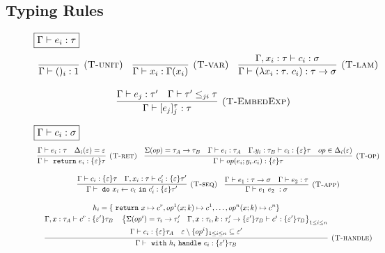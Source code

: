 \subsection{Typing Rules}

\begin{figure}[t]
\footnotesize{
\noindent$\fbox{$\Gamma \vdash e_i : \tau$}$
\[
\begin{array}{c}

\infer[\textsc{(T-unit)}]
  {\Gamma \vdash ()_i : 1}
  {} \quad 

\infer[\textsc{(T-var)}]
  {\Gamma \vdash x_i : \Gamma(x_i)}
  {} \quad 

\infer[\textsc{(T-lam)}]
  {\Gamma \vdash (\lambda x_i: \tau.\ c_i) : \tau \rightarrow \sigma}
  {\Gamma, x_i:\tau \vdash c_i : \sigma} \\[3ex]
  
\infer[\textsc{(T-EmbedExp)}]
  {\Gamma \vdash [e_j]^\tau_j : \tau}
  {\Gamma \vdash e_j : \tau' & \Gamma \vdash \tau' \leq_{ji} \tau} \quad  
\end{array} \\[3ex]
\]


\noindent$\fbox{$\Gamma \vdash c_i : \sigma$}$
\[
\begin{array}{c}

\infer[\textsc{(T-ret)}]
  {\Gamma\vdash \m{return} e_i : \{\varepsilon\}\tau }
  {\Gamma\vdash e_i : \tau & \Delta_i(\varepsilon) = \varepsilon} \quad 
  
\infer[\textsc{(T-op)}]
  {\Gamma\vdash op(e_i; y_i.c_i) : \{\varepsilon\}\tau }
  {\Sigma(op) = \tau_A \rightarrow \tau_B & \Gamma \vdash e_i : \tau_A & \Gamma. y_i:\tau_B\vdash c_i: \{\varepsilon\}\tau & op \in \Delta_i(\varepsilon)} \\[3ex]


\infer[\textsc{(T-seq)}]
  {\Gamma\vdash \m{do} x_i \leftarrow c_i \m{in} c_i' : \{\varepsilon\}\tau' }
  {\Gamma \vdash c_i : \{\varepsilon\}\tau & \Gamma, x_i:\tau \vdash c_i': \{\varepsilon\}\tau'} \quad 
  
  
\infer[\textsc{(T-app)}]
  {\Gamma\vdash e_1\ e_2\ : \sigma }
  {\Gamma \vdash e_1 : \tau \rightarrow \sigma & \Gamma \vdash e_2 : \tau} \\[3ex]
  
\infer[\textsc{(T-handle)}]
  {\Gamma\vdash \m{with} h_i \m{handle} c_i: \{\varepsilon'\} \tau_B}
  {\begin{gathered}
  h_i = \{\m{return} x \mapsto c^r, op^1(x;k) \mapsto c^1, \dots, op^n(x;k) \mapsto c^n \}\\
  \Gamma, x: \tau_A \vdash c^r : \{\varepsilon'\}\tau_B \quad
  \left\{ \Sigma(op^i) = \tau_i \rightarrow \tau_i'  \quad \Gamma, x:\tau_i, k:\tau_i' \rightarrow \{\varepsilon'\}\tau_B \vdash c^i: \{\varepsilon'\}\tau_B    \right\}_{1 \leq i \leq n} \\
  \Gamma \vdash c_i : \{\varepsilon\}\tau_A \quad \varepsilon \setminus \{op^i\}_{1 \leq i \leq n} \subseteq \varepsilon'
  \end{gathered}} \\[3ex]
  

\end{array}\]}
\end{figure}
